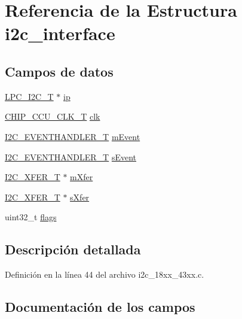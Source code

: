 \hypertarget{structi2c__interface}{}\section{Referencia de la Estructura i2c\+\_\+interface}
\label{structi2c__interface}
\subsection*{Campos de datos}
\begin{DoxyCompactItemize}
\item 
\hyperlink{struct_l_p_c___i2_c___t}{L\+P\+C\+\_\+\+I2\+C\+\_\+T} $\ast$ \hyperlink{structi2c__interface_afa7da7728fbdf79d769f018dd9b31bd6}{ip}
\item 
\hyperlink{chip__clocks_8h_a45bb23228b9831321626c103ada7c60b}{C\+H\+I\+P\+\_\+\+C\+C\+U\+\_\+\+C\+L\+K\+\_\+T} \hyperlink{structi2c__interface_a94839755e727dc62b29af549660a5de5}{clk}
\item 
\hyperlink{group___i2_c__18_x_x__43_x_x_gaef152f4dc1487d90573810007489082e}{I2\+C\+\_\+\+E\+V\+E\+N\+T\+H\+A\+N\+D\+L\+E\+R\+\_\+T} \hyperlink{structi2c__interface_af1fb8e01c805d98276dfe11692793583}{m\+Event}
\item 
\hyperlink{group___i2_c__18_x_x__43_x_x_gaef152f4dc1487d90573810007489082e}{I2\+C\+\_\+\+E\+V\+E\+N\+T\+H\+A\+N\+D\+L\+E\+R\+\_\+T} \hyperlink{structi2c__interface_ad385e4f04cb7955f4b7db77a45e6702c}{s\+Event}
\item 
\hyperlink{struct_i2_c___x_f_e_r___t}{I2\+C\+\_\+\+X\+F\+E\+R\+\_\+T} $\ast$ \hyperlink{structi2c__interface_a98efce62ff892807937d2f94e58c2ab8}{m\+Xfer}
\item 
\hyperlink{struct_i2_c___x_f_e_r___t}{I2\+C\+\_\+\+X\+F\+E\+R\+\_\+T} $\ast$ \hyperlink{structi2c__interface_ae0980339e9d8a08f1243e3648cab99f2}{s\+Xfer}
\item 
uint32\+\_\+t \hyperlink{structi2c__interface_a773b39d480759f67926cb18ae2219281}{flags}
\end{DoxyCompactItemize}


\subsection{Descripción detallada}


Definición en la línea 44 del archivo i2c\+\_\+18xx\+\_\+43xx.\+c.



\subsection{Documentación de los campos}
